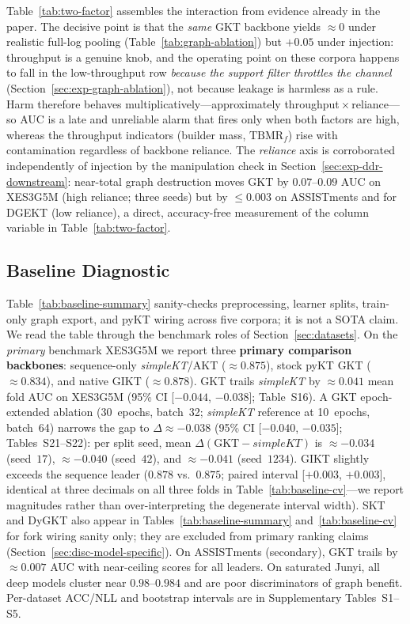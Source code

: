 \documentclass[pdflatex,sn-mathphys-num]{sn-jnl}
\newcommand{\GKTdeltaci}{[$-0.044$, $-0.038$]}
\newcommand{\GKTthirtydeltavec}{-0.038}
\newcommand{\GKTthirtydeltaci}{[$-0.040$, $-0.035$]}
\newcommand{\GIKTdeltaci}{[$+0.003$, $+0.003$]}
\begin{document}
Table~\ref{tab:two-factor} assembles the interaction from evidence already in
the paper. The decisive point is that the \emph{same} GKT backbone yields
${\approx}0$ under realistic full-log pooling (Table~\ref{tab:graph-ablation})
but $+0.05$ under injection: throughput is a genuine knob, and the operating
point on these corpora happens to fall in the low-throughput row \emph{because
the support filter throttles the channel} (Section~\ref{sec:exp-graph-ablation}),
not because leakage is harmless as a rule. Harm therefore behaves
multiplicatively---approximately throughput\,$\times$\,reliance---so AUC is a
late and unreliable alarm that fires only when both factors are high, whereas
the throughput indicators (builder mass, $\mathrm{TBMR}_f$) rise with
contamination regardless of backbone reliance. The \emph{reliance} axis is
corroborated independently of injection by the manipulation check in
Section~\ref{sec:exp-ddr-downstream}: near-total graph destruction moves GKT by
$0.07$--$0.09$ AUC on XES3G5M (high reliance; three seeds) but by ${\le}0.003$ on
ASSISTments and for DGEKT (low reliance), a direct, accuracy-free measurement of
the column variable in Table~\ref{tab:two-factor}.

\subsection{Baseline Diagnostic}
\label{sec:exp-baseline}

Table~\ref{tab:baseline-summary} sanity-checks preprocessing, learner splits,
train-only graph export, and pyKT wiring across five corpora; it is not a SOTA
claim. We read the table through the benchmark roles of Section~\ref{sec:datasets}.
On the \emph{primary} benchmark XES3G5M we report three \textbf{primary
comparison backbones}: sequence-only \textit{simpleKT}/AKT (${\approx}0.875$),
stock pyKT GKT (${\approx}0.834$), and native GIKT (${\approx}0.878$).
GKT trails \textit{simpleKT} by ${\approx}0.041$ mean fold AUC on XES3G5M
(95\% CI \GKTdeltaci{}; Table~S16). A GKT epoch-extended ablation (30~epochs,
batch~32; \textit{simpleKT} reference at 10~epochs, batch~64) narrows the gap to
$\Delta{\approx}\GKTthirtydeltavec{}$ (95\% CI \GKTthirtydeltaci{};
Tables~S21--S22): per split seed, mean $\Delta(\text{GKT}-\textit{simpleKT})$
is ${\approx}{-}0.034$ (seed~$17$), ${\approx}{-}0.040$ (seed~$42$), and
${\approx}{-}0.041$ (seed~$1234$). GIKT slightly exceeds the sequence leader
($0.878$ vs.\ $0.875$; paired interval \GIKTdeltaci{}, identical at three
decimals on all three folds in Table~\ref{tab:baseline-cv}---we report
magnitudes rather than over-interpreting the degenerate interval width).
SKT and DyGKT also appear in Tables~\ref{tab:baseline-summary}
and~\ref{tab:baseline-cv} for fork wiring sanity only; they are excluded from
primary ranking claims (Section~\ref{sec:disc-model-specific}).
On ASSISTments (secondary), GKT trails by ${\approx}0.007$ AUC with
near-ceiling scores for all leaders. On saturated Junyi, all deep models
cluster near $0.98$--$0.984$ and are poor discriminators of graph benefit.
Per-dataset ACC/NLL and bootstrap intervals are in Supplementary Tables~S1--S5.
\end{document}
